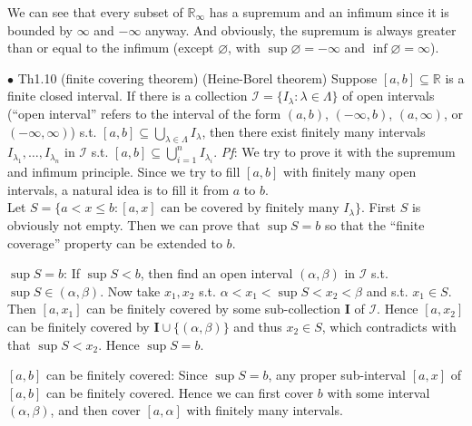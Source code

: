 \documentclass{article}
\begin{document}
\begin{Rmk}{}
    We can see that \textcolor{Th}{every subset of $\mathbb{R}_\infty$ has a supremum and an infimum} since it is bounded by $\infty$ and $-\infty$ anyway. And obviously, \textcolor{Th}{the supremum is always greater than or equal to the infimum (except $\varnothing$, with $\sup\varnothing = -\infty$ and $\inf\varnothing = \infty$).}
\end{Rmk}

\begin{Th}{$\bullet$ Th1.10 (finite covering theorem) (Heine-Borel theorem)}
    Suppose $[a,b]\subseteq\mathbb{R}$ is a finite closed interval. If there is a collection $\mathcal{I} = \{I_\lambda: \lambda\in\Lambda\}$ of open intervals (``open interval'' refers to the interval of the form $(a,b)$, $(-\infty, b)$, $(a, \infty)$, or $(-\infty, \infty)$) s.t. $[a,b]\subseteq\bigcup\limits_{\lambda\in\Lambda}I_\lambda$, then there exist finitely many intervals $I_{\lambda_1}, \dots, I_{\lambda_n}$ in $\mathcal{I}$ s.t. $[a,b]\subseteq\bigcup\limits_{i=1}^nI_{\lambda_i}$.
    \tcblower
    \textit{Pf}: We try to prove it with the supremum and infimum principle. Since we try to fill $[a,b]$ with finitely many open intervals, a natural idea is to fill it from $a$ to $b$. \\
    Let $S = \{a<x\leq b: [a,x] \text{ can be covered by finitely many } I_\lambda\}$. First $S$ is obviously not empty. Then we can prove that $\sup S = b$ so that the ``finite coverage'' property can be extended to $b$.
    \begin{compactenum}
        \item $\sup S = b$: If $\sup S < b$, then find an open interval $(\alpha, \beta)$ in $\mathcal{I}$ s.t. $\sup S\in (\alpha, \beta)$. Now take $x_1, x_2$ s.t. $\alpha<x_1<\sup S<x_2<\beta$ and s.t. $x_1\in S$. Then $[a, x_1]$ can be finitely covered by some sub-collection $\pmb{I}$ of $\mathcal{I}$. Hence $[a, x_2]$ can be finitely covered by $\pmb{I}\cup\{(\alpha, \beta)\}$ and thus $x_2\in S$, which contradicts with that $\sup S<x_2$. Hence $\sup S = b$.
        \item $[a,b]$ can be finitely covered: Since $\sup S = b$, any proper sub-interval $[a,x]$ of $[a,b]$ can be finitely covered. Hence we can first cover $b$ with some interval $(\alpha, \beta)$, and then cover $[a, \alpha]$ with finitely many intervals. 
    \end{compactenum}
\end{Th}
\end{document}
